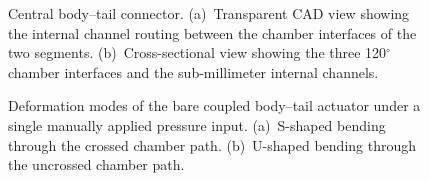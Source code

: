 \begin{figure}[tb]
  \centering
  \caption{Central body--tail connector. (a)~Transparent CAD view showing
  the internal channel routing between the chamber interfaces of the two
  segments. (b)~Cross-sectional view showing the three 120$^{\circ}$
  chamber interfaces and the sub-millimeter internal channels.}
  \label{fig:lizard-connector}
\end{figure}

\begin{figure}[tb]
  \centering
  \caption{Deformation modes of the bare coupled body--tail actuator under
  a single manually applied pressure input. (a)~S-shaped bending through
  the crossed chamber path. (b)~U-shaped bending through the uncrossed
  chamber path.}
  \label{fig:lizard-s-u-modes}
\end{figure}
